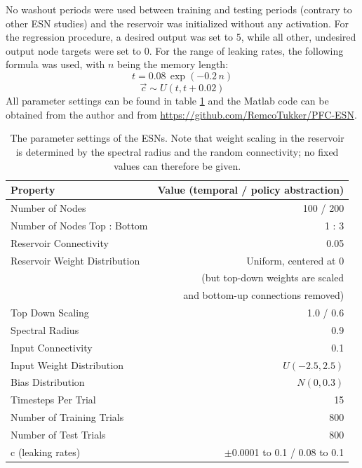 \documentclass[10pt,a4paper]{report}
\begin{document}
No washout periods were used between training and testing periods (contrary to other ESN studies) and the reservoir was initialized without any activation. For the regression procedure, a desired output was set to 5, while all other, undesired output node targets were set to 0. For the range of leaking rates, the following formula was used, with $n$ being the memory length:
\[ t = 0.08 \, \exp(-0.2 \, n) \]
\[ \vec{c} \sim U(t , t + 0.02) \]
All parameter settings can be found in table \ref{parameters} and the Matlab code can be obtained from the author and from \url{https://github.com/RemcoTukker/PFC-ESN}.

\begin{table}[!h]
\begin{center}
  \begin{tabular}{ | l | r | }
    \hline
    Property & Value (temporal / policy abstraction) \\ \hline \hline
    Number of Nodes & 100 / 200 \\  \hline
    Number of Nodes Top : Bottom & 1 : 3 \\  \hline    
    Reservoir Connectivity & 0.05 \\ \hline
    Reservoir Weight Distribution & Uniform, centered at 0 \\
    & (but top-down weights are scaled \\ 
    & and bottom-up connections removed) \\ \hline    
    Top Down Scaling & 1.0 / 0.6 \\  \hline
    Spectral Radius & 0.9 \\ \hline
    Input Connectivity & 0.1 \\ \hline
    Input Weight Distribution & $U(-2.5 , 2.5)$ \\ \hline
    Bias Distribution & $N(0 , 0.3)$  \\ \hline
    Timesteps Per Trial & 15 \\ \hline
    Number of Training Trials & 800 \\ \hline
    Number of Test Trials & 800 \\ \hline
    c (leaking rates) & $\pm$0.0001 to 0.1 / 0.08 to 0.1 \\ \hline
  \end{tabular}
\end{center}
\caption{The parameter settings of the ESNs. Note that weight scaling in the reservoir is determined by the spectral radius and the random connectivity; no fixed values can therefore be given.}
\label{parameters}
\end{table}
\end{document}
